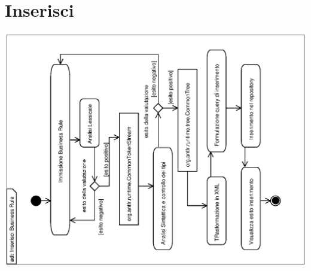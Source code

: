 \documentclass[11pt,titlepage,a4paper]{report}
\begin{document}
\section{Inserisci \br}
\begin{center}
 \includegraphics[width=1\textwidth, angle=-90]{InserisciBusinessRule.eps}
\end{center}
\end{document}
